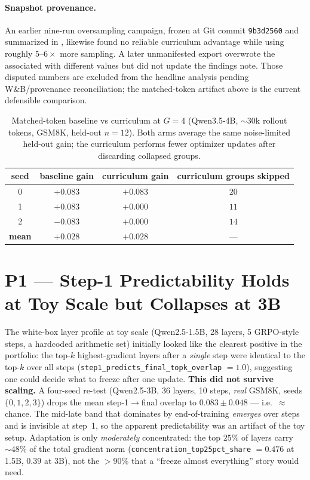 \paragraph{Snapshot provenance.} An earlier nine-run oversampling campaign, frozen
at Git commit \texttt{9b3d2560} and summarized in
, likewise found no reliable
curriculum advantage while using roughly $5$--$6\times$ more sampling. A later
unmanifested export overwrote the associated  with different
values but did not update the findings note. Those disputed numbers are excluded
from the headline analysis pending W\&B/provenance reconciliation; the matched-token
artifact above is the current defensible comparison.

\begin{table}[t]
\centering
\small
\begin{tabular}{@{}cccc@{}}
\toprule
seed & baseline gain & curriculum gain & curriculum groups skipped \\
\midrule
0 & $+0.083$ & $+0.083$ & $20$ \\
1 & $+0.083$ & $+0.000$ & $11$ \\
2 & $-0.083$ & $+0.000$ & $14$ \\
\midrule
\textbf{mean} & $\mathbf{+0.028}$ & $\mathbf{+0.028}$ & --- \\
\bottomrule
\end{tabular}
\caption{Matched-token baseline vs curriculum at $G{=}4$ (Qwen3.5-4B,
${\sim}30$k rollout tokens, GSM8K, held-out $n=12$). Both arms average the same
noise-limited held-out gain; the curriculum performs fewer optimizer updates after
discarding collapsed groups.}
\label{tab:campaign}
\end{table}

\section{P1 --- Step-1 Predictability Holds at Toy Scale but Collapses at 3B}
\label{sec:p1}

The white-box layer profile at toy scale (Qwen2.5-1.5B, 28 layers, 5 GRPO-style
steps, a hardcoded arithmetic set) initially looked like the clearest positive in
the portfolio: the top-$k$ highest-gradient layers after a \emph{single} step were
identical to the top-$k$ over all steps
(\texttt{step1\_predicts\_final\_topk\_overlap} $=1.0$), suggesting one could decide
what to freeze after one update. \textbf{This did not survive scaling.} A four-seed
re-test (Qwen2.5-3B, 36 layers, 10 steps, \emph{real} GSM8K, seeds
$\{0,1,2,3\}$) drops the mean step-1$\to$final overlap to
$0.083\pm0.048$ --- i.e.\ ${\approx}$chance. The mid-late band that dominates by end-of-training
\emph{emerges} over steps and is invisible at step~1, so the apparent predictability
was an artifact of the toy setup. Adaptation is only \emph{moderately} concentrated:
the top $25\%$ of layers carry ${\sim}48\%$ of the total gradient norm
(\texttt{concentration\_top25pct\_share} $=0.476$ at 1.5B, $0.39$ at 3B), not the
$>90\%$ that a ``freeze almost everything'' story would need.

